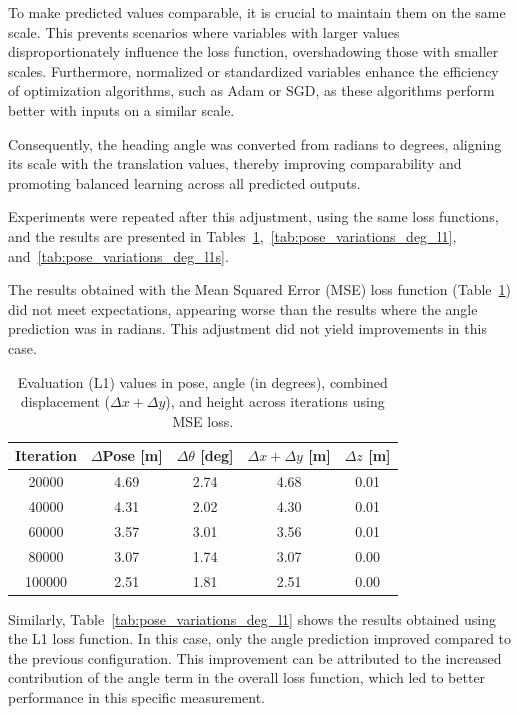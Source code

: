 To make predicted values comparable, it is crucial to maintain them on the same scale. This prevents scenarios where variables with larger values disproportionately influence the loss function, overshadowing those with smaller scales. Furthermore, normalized or standardized variables enhance the efficiency of optimization algorithms, such as Adam or SGD, as these algorithms perform better with inputs on a similar scale.

Consequently, the heading angle was converted from radians to degrees, aligning its scale with the translation values, thereby improving comparability and promoting balanced learning across all predicted outputs.

Experiments were repeated after this adjustment, using the same loss functions, and the results are presented in Tables~\ref{tab:pose_variations_deg_mse},~\ref{tab:pose_variations_deg_l1}, and~\ref{tab:pose_variations_deg_l1s}.

The results obtained with the Mean Squared Error (MSE) loss function (Table~\ref{tab:pose_variations_deg_mse}) did not meet expectations, appearing worse than the results where the angle prediction was in radians. This adjustment did not yield improvements in this case.

\begin{table}[H]
    \centering
    \scriptsize
    \renewcommand{\arraystretch}{1.2} 
    \setlength{\tabcolsep}{10pt} 
    \begin{tabular}{c c c c c}
        \toprule
        \textbf{Iteration} & \textbf{$\Delta$Pose [m]} & \textbf{$\Delta \theta$ [deg]} & \textbf{$\Delta x + \Delta y$ [m]} & \textbf{$\Delta z$ [m]} \\
        \midrule
        \num{20000}  & 4.69 & 2.74  & 4.68 & 0.01 \\
        \num{40000}  & 4.31 & 2.02  & 4.30 & 0.01 \\
        \num{60000}  & 3.57 & 3.01  & 3.56 & 0.01 \\
        \num{80000}  & 3.07 & 1.74  & 3.07 & 0.00 \\
        \num{100000} & 2.51 & 1.81  & 2.51 & 0.00 \\
        \bottomrule
    \end{tabular}
    \caption{Evaluation (L1) values in pose, angle (in degrees), combined displacement ($\Delta x + \Delta y$), and height across iterations using MSE loss.}
    \label{tab:pose_variations_deg_mse}
\end{table}

Similarly, Table~\ref{tab:pose_variations_deg_l1} shows the results obtained using the L1 loss function. In this case, only the angle prediction improved compared to the previous configuration. This improvement can be attributed to the increased contribution of the angle term in the overall loss function, which led to better performance in this specific measurement.

